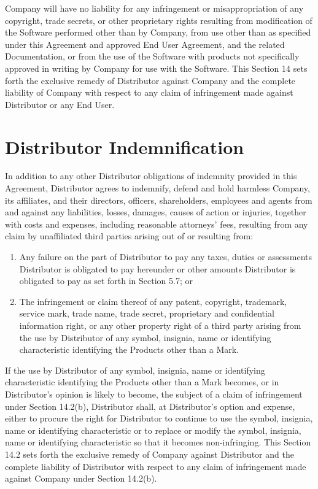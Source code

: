 \documentclass[letterpaper,10pt,english]{sphinxmanual}
\begin{document}
Company will have no liability for any infringement or misappropriation of any copyright, trade secrets, or other proprietary rights resulting from modification of the Software performed other than by Company, from use other than as specified under this Agreement and approved End User Agreement, and the related Documentation, or from the use of the Software with products not specifically approved in writing by Company for use with the Software. This Section 14 sets forth the exclusive remedy of Distributor against Company and the complete liability of Company with respect to any claim of infringement made against Distributor or any End User.


\section{Distributor Indemnification}
\label{\detokenize{indemnification:distributor-indemnification}}
In addition to any other Distributor obligations of indemnity provided in this Agreement, Distributor agrees to indemnify, defend and hold harmless Company, its affiliates, and their directors, officers, shareholders, employees and agents from and against any liabilities, losses, damages, causes of action or injuries, together with costs and expenses, including reasonable attorneys’ fees, resulting from any claim by unaffiliated third parties arising out of or resulting from:
\begin{enumerate}
\item {} 
Any failure on the part of Distributor to pay any taxes, duties or assessments Distributor is obligated to pay hereunder or other amounts Distributor is obligated to pay as set forth in Section 5.7; or

\item {} 
The infringement or claim thereof of any patent, copyright, trademark, service mark, trade name, trade secret, proprietary and confidential information right, or any other property right of a third party arising from the use by Distributor of any symbol, insignia, name or identifying characteristic identifying the Products other than a Mark.

\end{enumerate}

If  the use by Distributor of any symbol, insignia, name or identifying characteristic identifying the Products other than a Mark becomes, or in Distributor’s opinion is likely to become, the subject of a claim of infringement under Section 14.2(b), Distributor shall, at Distributor’s option and expense, either to procure the right for Distributor to continue to use the symbol, insignia, name or identifying characteristic or to replace or modify the symbol, insignia, name or identifying characteristic  so that it becomes non-infringing. This Section 14.2 sets forth the exclusive remedy of Company against Distributor and the complete liability of Distributor with respect to any claim of infringement made against Company under Section 14.2(b).
\end{document}
